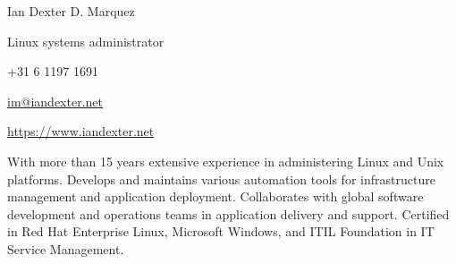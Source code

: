 \documentclass[10pt, a4paper, final]{article}
\begin{document}
\begin{minipage}[c]{0.5\textwidth}
  \begin{flushleft}\begin{spacing}{1}
    \Huge Ian Dexter D. Marquez

    \Large Linux systems administrator
  \end{spacing}\end{flushleft}
\end{minipage}
\begin{minipage}[c]{0.5\textwidth}
  \begin{flushright}\begin{spacing}{1}\small
    +31 6 1197 1691 

    \href{mailto:im@iandexter.net}{im@iandexter.net} 

    \href{https://www.iandexter.net}{https://www.iandexter.net} 
  \end{spacing}\end{flushright}
\end{minipage}
\vspace{1em}
\hrulefill

With more than 15 years extensive experience in administering Linux and Unix platforms. Develops and maintains various automation tools for infrastructure management and application deployment. Collaborates with global software development and operations teams in application delivery and support. Certified in Red Hat Enterprise Linux, Microsoft Windows, and ITIL Foundation in IT Service Management.

\vspace{1.5em}
\end{document}
